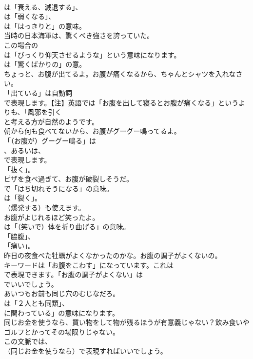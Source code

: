 \documentclass[8pt]{extreport}
\begin{document}
\begin{CJK}{UTF8}{min}
\\	は「衰える、減退する」、
\\	は「弱くなる」、
\\	は「はっきりと」の意味。	
\\	当時の日本海軍は、驚くべき強さを誇っていた。 
\\	この場合の 
\\	は「びっくり仰天させるような」という意味になります。
\\	は「驚くばかりの」の意。	
\\	ちょっと、お腹が出てるよ。お腹が痛くなるから、ちゃんとシャツを入れなさい。 
\\	「出ている」は自動詞
\\	で表現します。【注】英語では「お腹を出して寝るとお腹が痛くなる」というよりも、「風邪を引く
\\	と考える方が自然のようです。	
\\	朝から何も食べてないから、お腹がグーグー鳴ってるよ。 
\\	「（お腹が）グーグー鳴る」は
\\	、あるいは、
\\	で表現します。
\\	「抜く」。	
\\	ピザを食べ過ぎて、お腹が破裂しそうだ。 
\\	で「はち切れそうになる」の意味。
\\	は「裂く」。
\\	（爆発する）も使えます。	
\\	お腹がよじれるほど笑ったよ。 
\\	は「（笑いで）体を折り曲げる」の意味。
\\	「脇腹」、
\\	「痛い」。	
\\	昨日の夜食べた牡蠣がよくなかったのかな。お腹の調子がよくないの。 
\\	キーワードは「お腹をこわす」になっています。これは
\\	で表現できます。「お腹の調子がよくない」は
\\	でいいでしょう。	
\\	あいつもお前も同じ穴のむじなだろ。 
\\	は「２人とも同類」、
\\	に関わっている」の意味になります。	
\\	同じお金を使うなら、買い物をして物が残るほうが有意義じゃない？飲み食いやゴルフとかってその場限りじゃない。 
\\	この文脈では、
\\	（同じお金を使うなら）で表現すればいいでしょう。

\end{CJK}
\end{document}
